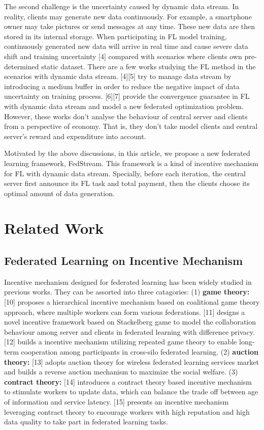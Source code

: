 \documentclass{article}
\theoremstyle{plain}
\theoremstyle{definition}
\theoremstyle{remark}
\begin{document}
The second challenge is the uncertainty caused by dynamic data stream. 
In reality, clients may generate new data continuously. 
For example, a smartphone owner may take pictures or send messages at any time. These new data are then stored in its internal storage.
When participating in FL model training, continuously generated new data will arrive in real time and cause severe data shift and training uncertainty [4] compared with scenarios where clients own pre-determined static dataset.
There are a few works studying the FL method in the scenarios with dynamic data stream. [4][5] try to manage data stream by introducing a medium buffer in order to reduce the negative impact of data uncertainty on training process. [6][7] provide the convergence guarantee in FL with dynamic data stream and model a new federated optimization problem.
However, these works don't analyse the behaviour of central server and clients from a perspective of economy. That is, they don't take model clients and central server's reward and expenditure into account.

Motivated by the above discussions, in this article, we propose a new federated learning framework, FedStream. This framework is a kind of incentive mechanism for FL with dynamic data stream.  
Specially, before each iteration, the central server first announce its FL task and total payment, then the clients choose its optimal amount of data generation.

\section{Related Work}
\label{Related Work}
\subsection{Federated Learning on Incentive Mechanism}
Incentive mechanism designed for federated learning has been widely studied in previous works.
They can be assorted into three catagories:
(1) \textbf{game theory:} [10]  proposes a hierarchical incentive mechanism based on coalitional game theory approach, where multiple workers can form various federations.
[11] designs a novel incentive framework based on Stackelberg game to model the collaboration behaviour among server and clients in federated learning with difference privacy.
[12] builds a incentive mechanism utilizing repeated game theory to enable long-term cooperation among participants in cross-silo federated learning.
(2) \textbf{auction theory:} [13] adopts auction theory for wireless federated learning services market and builds a reverse auction mechanism to maximize the social welfare.
(3) \textbf{contract theory:} [14] introduces a contract theory based incentive mechanism to stimulate workers to update data, which can balance the trade off between age of information and service latency.
[15] presents an incentive mechanism leveraging contract theory to encourage workers with high reputation and high data quality to take part in federated learning tasks.
\end{document}
